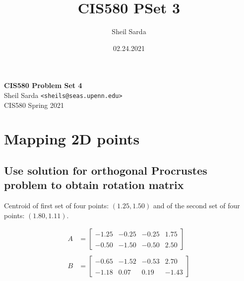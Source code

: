 \documentclass[12pt, oneside]{article}
\title{CIS580 PSet 3}
\author{Sheil Sarda}
\date{02.24.2021}
\begin{document}

\begin{titlepage}
    \begin{flushleft}
        \vspace*{1cm}
        \Huge
        \textbf{CIS580 Problem Set 4\\ }
        \vspace*{0.5cm}
        \normalsize
        Sheil Sarda \verb|<sheils@seas.upenn.edu>| \\
        CIS580 Spring 2021
        \tableofcontents
    \end{flushleft}
\end{titlepage}

\section{Mapping 2D points}

\subsection{Use solution for orthogonal Procrustes problem to obtain rotation 
matrix}

Centroid of first set of four points: $(1.25, 1.50)$ and of the 
second set of four points: $(1.80, 1.11)$.

\begin{align*}
    A    &= 
    \begin{bmatrix} -1.25 & -0.25 & -0.25 & 1.75\\ \\ 
                    -0.50 & -1.50 & -0.50 & 2.50
    \end{bmatrix} \\ \\
    B    &= 
    \begin{bmatrix} -0.65 & -1.52 & -0.53 & 2.70\\ \\ 
                    -1.18 &  0.07 &  0.19 & -1.43
    \end{bmatrix} 
\end{align*}
\end{document}
